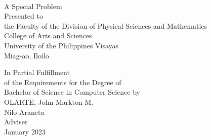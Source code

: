 \begin{titlepage}
\centering

 \\

\vspace{1.75cm}
A Special Problem\\
Presented to\\
the Faculty of the Division of Physical Sciences and Mathematics\\
College of Arts and Sciences\\
University of the Philippines Visayas\\
Miag-ao, Iloilo

\vspace{1.75cm}
In Partial Fulfillment\\
of the Requirements for the Degree of\\
Bachelor of Science in Computer Science
\vspace{1.75cm}
by\\

\vspace{1cm}
OLARTE, John Markton M.  \\

\vspace{1.75cm}
Nilo Araneta \\
Adviser\\

\vspace{1.75cm}
January 2023
\end{titlepage}
    